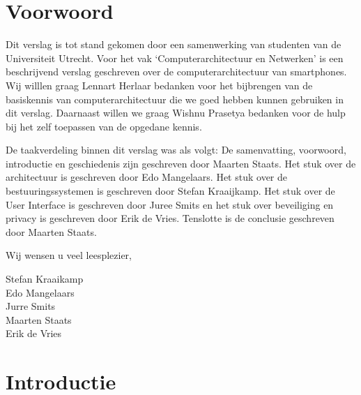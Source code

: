 \chapter{Voorwoord}

Dit verslag is tot stand gekomen door een samenwerking van studenten van de Universiteit Utrecht. Voor het vak ‘Computerarchitectuur en Netwerken’ is een beschrijvend verslag geschreven over de computerarchitectuur van smartphones. Wij willlen graag Lennart Herlaar bedanken voor het bijbrengen van de basiskennis van computerarchitectuur die we goed hebben kunnen gebruiken in dit verslag. Daarnaast willen we graag Wishnu Prasetya bedanken voor de hulp bij het zelf toepassen van de opgedane kennis.

De taakverdeling binnen dit verslag was als volgt: De samenvatting, voorwoord, introductie en geschiedenis zijn geschreven door Maarten Staats. Het stuk over de architectuur is geschreven door Edo Mangelaars. Het stuk over de bestuuringssystemen is geschreven door Stefan Kraaijkamp. Het stuk over de User Interface is geschreven door Juree Smits en het stuk over beveiliging en privacy is geschreven door Erik de Vries. Tenslotte is de conclusie geschreven door Maarten Staats.

Wij wensen u veel leesplezier,

Stefan Kraaikamp\\
Edo Mangelaars\\
Jurre Smits\\
Maarten Staats\\
Erik de Vries\\

\chapter{Introductie}

